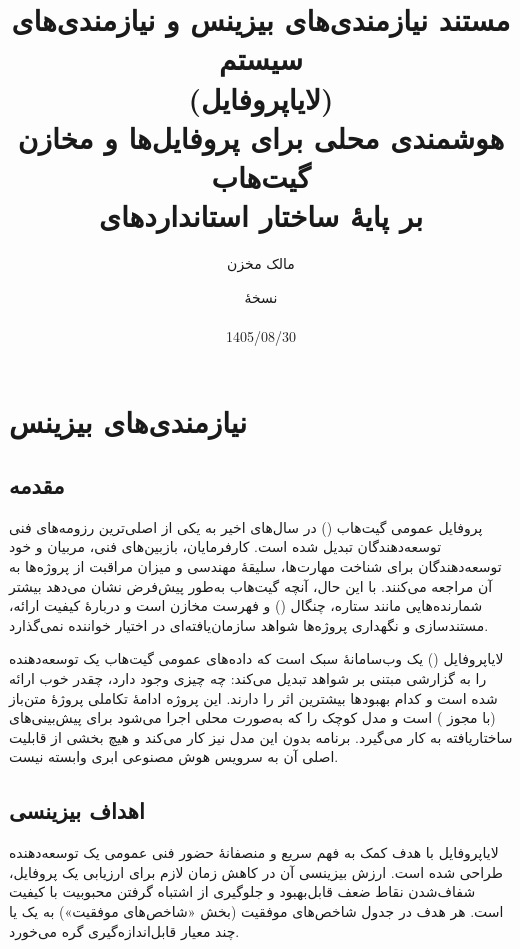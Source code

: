 \documentclass[12pt]{article}
\begin{document}
 \title{مستند نیازمندی‌های بیزینس و نیازمندی‌های سیستم \\  (لایاپروفایل) \\ هوشمندی محلی برای پروفایل‌ها و مخازن گیت‌هاب \\ بر پایهٔ ساختار استانداردهای }
\author{مالک مخزن}
\date{نسخهٔ  \\  \\ 1405/08/30}
\maketitle
 \tableofcontents
\clearpage
\section{نیازمندی‌های بیزینس}
\subsection{مقدمه}
 پروفایل عمومی گیت‌هاب () در سال‌های اخیر به یکی از اصلی‌ترین رزومه‌های فنی توسعه‌دهندگان تبدیل شده است. کارفرمایان، بازبین‌های فنی، مربیان و خود توسعه‌دهندگان برای شناخت مهارت‌ها، سلیقهٔ مهندسی و میزان مراقبت از پروژه‌ها به آن مراجعه می‌کنند. با این حال، آنچه گیت‌هاب به‌طور پیش‌فرض نشان می‌دهد بیشتر شمارنده‌هایی مانند ستاره، چنگال () و فهرست مخازن است و دربارهٔ کیفیت ارائه، مستندسازی و نگهداری پروژه‌ها شواهد سازمان‌یافته‌ای در اختیار خواننده نمی‌گذارد.

 لایاپروفایل () یک وب‌سامانهٔ سبک است که داده‌های عمومی گیت‌هاب یک توسعه‌دهنده را به گزارشی مبتنی بر شواهد تبدیل می‌کند: چه چیزی وجود دارد، چقدر خوب ارائه شده است و کدام بهبودها بیشترین اثر را دارند. این پروژه ادامهٔ تکاملی پروژهٔ متن‌باز  (با مجوز ) است و مدل کوچک  را که به‌صورت محلی اجرا می‌شود برای پیش‌بینی‌های ساختاریافته به کار می‌گیرد. برنامه بدون این مدل نیز کار می‌کند و هیچ بخشی از قابلیت اصلی آن به سرویس هوش مصنوعی ابری وابسته نیست.
 \subsection{اهداف بیزینسی}
 لایاپروفایل با هدف کمک به فهم سریع و منصفانهٔ حضور فنی عمومی یک توسعه‌دهنده طراحی شده است. ارزش بیزینسی آن در کاهش زمان لازم برای ارزیابی یک پروفایل، شفاف‌شدن نقاط ضعف قابل‌بهبود و جلوگیری از اشتباه گرفتن محبوبیت با کیفیت است. هر هدف در جدول شاخص‌های موفقیت (بخش «شاخص‌های موفقیت») به یک یا چند معیار قابل‌اندازه‌گیری گره می‌خورد.
\end{document}

